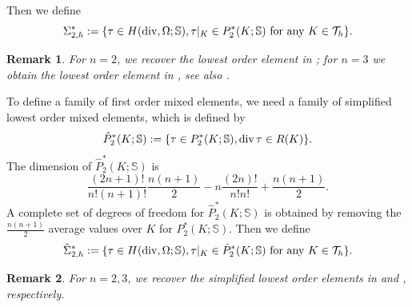 \documentclass{amsart}
\newtheorem{remark}{Remark}[section]
\numberwithin{table}{section}
\numberwithin{figure}{section}
\begin{document}
Then we define
\begin{equation}\label{Shplus}
\Sigma_{2,h}^\ast:=\{\tau\in H(\operatorname{div}, \Omega; \mathbb{S}), \tau|_K\in P_2^\ast(K; \mathbb{S}) \text{ for  any }K\in\mathcal{T}_h\}.
\end{equation}

\begin{remark} For $n=2$, we  recover the  lowest order element in \cite{Arnold-Winther-conforming};
 for $n=3$ we obtain the lowest order element
  in \cite{Adams-Cockburn}, see also \cite{Arnold-Awanou-Winther}.
\end{remark}

To define a  family of first order mixed elements, we need a   family of  simplified lowest order mixed elements, which is defined by
 \begin{equation}
  \hat{P}_2^\ast(K; \mathbb{S}):=\{\tau\in P_2^\ast(K; \mathbb{S}), \operatorname{div}\tau\in R(K)\}.
  \end{equation}
  The dimension of  $\hat{P}_2^\ast(K; \mathbb{S})$ is
  $$
  \frac{(2n+1)!}{n!(n+1)!}\frac{n(n+1)}{2}-n\frac{(2n)!}{n!n!}+\frac{n(n+1)}{2}.
  $$
 A complete set of degrees of freedom for $\hat{P}_2^\ast(K; \mathbb{S})$  is obtained by removing the $\frac{n(n+1)}{2}$ average values over $K$
  for   $P_2^\ast(K; \mathbb{S})$.
Then we define
\begin{equation}\label{hatShplus}
\hat{\Sigma}_{2,h}^\ast:=\{\tau\in H(\operatorname{div}, \Omega; \mathbb{S}), \tau|_K\in \hat{P}_2^\ast(K; \mathbb{S}) \text{ for  any }K\in\mathcal{T}_h\}.
\end{equation}
\begin{remark} For $n=2, 3$, we  recover the simplified   lowest order elements in \cite{Arnold-Winther-conforming} and  \cite{Arnold-Awanou-Winther}, respectively.
\end{remark}
\end{document}
